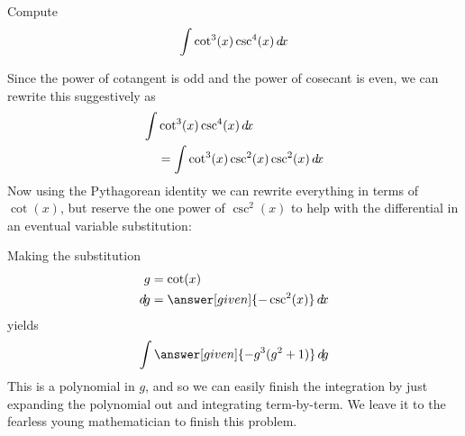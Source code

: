 \documentclass{ximera}
\begin{document}
\begin{example}
  Compute
  \[
  \int \cot^3(x) \csc^4(x) \mathop{}\!d\! x
  \]
  \begin{explanation}
    Since the power of cotangent is odd and the power of cosecant is even,
    we can rewrite this suggestively as
    \begin{align*}
      \int &\cot^3(x) \csc^4(x) \mathop{}\!d\! x \\
    &= \int\cot^3(x) \csc^2(x) \csc^2(x) \mathop{}\!d\! x
    \end{align*}
    Now using the Pythagorean identity we can rewrite everything in
    terms of $\cot(x)$, but reserve the one power of $\csc^2(x)$ to help
    with the differential in an eventual variable substitution:
    \begin{center}%
    \end{center}
    Making the substitution
    \begin{align*}
      g &= \cot(x)\\
      \d g &=\answer[given]{-\csc^2(x)} \d x
    \end{align*}
    yields
    \[
    \int \answer[given]{-g^3(g^2+1)} \d g
    \]
    This is a polynomial in $g$, and so we can easily finish the
    integration by just expanding the polynomial out and integrating
    term-by-term. We leave it to the fearless young mathematician to
    finish this problem.
  \end{explanation}
\end{example}
\end{document}

